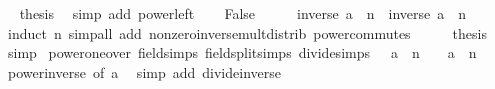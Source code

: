\begin{isabellebody}
\ \isamarkupfalse%
\ {\isacharquery}{\kern0pt}thesis\ \isamarkupfalse%
\ {\isacharparenleft}{\kern0pt}simp\ add{\isacharcolon}{\kern0pt}\ power{\isacharunderscore}{\kern0pt}{}{\isacharunderscore}{\kern0pt}left{\isacharparenright}{\kern0pt}\isanewline
{}\isamarkupfalse%
\isanewline
\ \ \isamarkupfalse%
\ False\isanewline
\ \ \isamarkupfalse%
\ \isamarkupfalse%
\ {\isachardoublequoteopen}inverse\ {\isacharparenleft}{\kern0pt}a\ {\isacharcircum}{\kern0pt}\ n{\isacharparenright}{\kern0pt}\ {\isacharequal}{\kern0pt}\ inverse\ a\ {\isacharcircum}{\kern0pt}\ n{\isachardoublequoteclose}\isanewline
\ \ \ \ \isamarkupfalse%
\ {\isacharparenleft}{\kern0pt}induct\ n{\isacharparenright}{\kern0pt}\ {\isacharparenleft}{\kern0pt}simp{\isacharunderscore}{\kern0pt}all\ add{\isacharcolon}{\kern0pt}\ nonzero{\isacharunderscore}{\kern0pt}inverse{\isacharunderscore}{\kern0pt}mult{\isacharunderscore}{\kern0pt}distrib\ power{\isacharunderscore}{\kern0pt}commutes{\isacharparenright}{\kern0pt}\isanewline
\ \ \isamarkupfalse%
\ \isamarkupfalse%
\ {\isacharquery}{\kern0pt}thesis\ \isamarkupfalse%
\ simp\isanewline
{}\isamarkupfalse%
%
\endisatagproof
{\isafoldproof}%
%
\isadelimproof
\isanewline
%
\endisadelimproof
\isanewline
{}\isamarkupfalse%
\ power{\isacharunderscore}{\kern0pt}one{\isacharunderscore}{\kern0pt}over\ {\isacharbrackleft}{\kern0pt}field{\isacharunderscore}{\kern0pt}simps{\isacharcomma}{\kern0pt}\ field{\isacharunderscore}{\kern0pt}split{\isacharunderscore}{\kern0pt}simps{\isacharcomma}{\kern0pt}\ divide{\isacharunderscore}{\kern0pt}simps{\isacharbrackright}{\kern0pt}{\isacharcolon}{\kern0pt}\ {\isachardoublequoteopen}{\isacharparenleft}{\kern0pt}{}\ {\isacharslash}{\kern0pt}\ a{\isacharparenright}{\kern0pt}\ {\isacharcircum}{\kern0pt}\ n\ {\isacharequal}{\kern0pt}\ {}\ {\isacharslash}{\kern0pt}\ a\ {\isacharcircum}{\kern0pt}\ n{\isachardoublequoteclose}\isanewline
%
\isadelimproof
\ \ %
\endisadelimproof
%
\isatagproof
{}\isamarkupfalse%
\ power{\isacharunderscore}{\kern0pt}inverse\ {\isacharbrackleft}{\kern0pt}of\ a{\isacharbrackright}{\kern0pt}\ \isamarkupfalse%
\ {\isacharparenleft}{\kern0pt}simp\ add{\isacharcolon}{\kern0pt}\ divide{\isacharunderscore}{\kern0pt}inverse{\isacharparenright}{\kern0pt}%
\endisatagproof
{\isafoldproof}%
%
\isadelimproof
\isanewline
%
\endisadelimproof
\isanewline
{}\isamarkupfalse%

\end{isabellebody}
